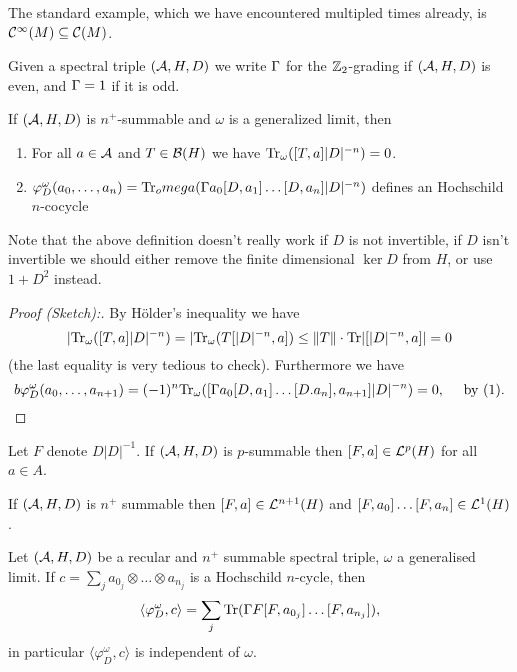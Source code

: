 \begin{example}
 The standard example, which we have encountered multipled times already, is $\mathcal{C}^\infty(M)\subseteq\mathcal{C}(M)$.
\end{example}

\noindent Given a spectral triple $(\mathcal{A},H,D)$ we write $\Gamma$ for the $\mathbb{Z}_2$-grading if $(\mathcal{A},H,D)$ is even, and $\Gamma=1$ if it is odd.

\begin{lemma}
 If $(\mathcal{A},H,D)$ is $n^+$-summable and $\omega$ is a generalized limit, then 
 \begin{enumerate}
  \item For all $a\in\mathcal{A}$ and $T\in\mathcal{B}(H)$ we have $\mathrm{Tr}_\omega([T,a]|D|^{-n})=0$.
  \item $\varphi^\omega_D(a_0,\ldots,a_n)=\mathrm{Tr}_omega(\Gamma a_0[D,a_1]\ldots[D,a_n]|D|^{-n})$ defines an Hochschild $n$-cocycle
 \end{enumerate}
 
 \noindent Note that the above definition doesn't really work if $D$ is not invertible, if $D$ isn't invertible we should either remove the finite dimensional $\ker D$ from $H$, or use $1+D^2$ instead.
\end{lemma}

\begin{proof}[Proof (Sketch):]
 By Hölder's inequality we have $$|\mathrm{Tr}_\omega([T,a]|D|^{-n})=|\mathrm{Tr}_\omega(T[|D|^{-n},a])\leq\|T\|\cdot\mathrm{Tr}|[|D|^{-n},a]|=0$$
 (the last equality is very tedious to check). Furthermore we have
 $$b\varphi^\omega_D(a_0,\ldots,a_{n+1})=(-1)^n\mathrm{Tr}_\omega([\Gamma a_0[D,a_1]\ldots[D.a_n],a_{n+1}]|D|^{-n})=0,\quad\text{ by (1)}.$$
\end{proof}

\begin{lemma}
 Let $F$ denote $D|D|^{-1}$. If $(\mathcal{A},H,D)$ is $p$-summable then $[F,a]\in\mathcal{L}^p(H)$ for all $a\in A$.
\end{lemma}

\begin{corollary}
 If $(\mathcal{A},H,D)$ is $n^+$ summable then $[F,a]\in\mathcal{L}^{n+1}(H)$ and $[F,a_0]\ldots[F,a_n]\in\mathcal{L}^{1}(H)$.
\end{corollary}

\begin{theorem}
Let $(\mathcal{A},H,D)$ be a recular and $n^+$ summable spectral triple, $\omega$ a generalised limit. If $c=\sum_j a_{0_j}\otimes\ldots\otimes a_{n_j}$  is a Hochschild $n$-cycle, then 
$$\langle\varphi^\omega_D,c\rangle=\sum_j\mathrm{Tr}(\Gamma F[F,a_{0_j}]\ldots[F,a_{n_j}]),$$
in particular $\langle\varphi^\omega_D,c\rangle$ is independent of $\omega$.
 
\end{theorem}













